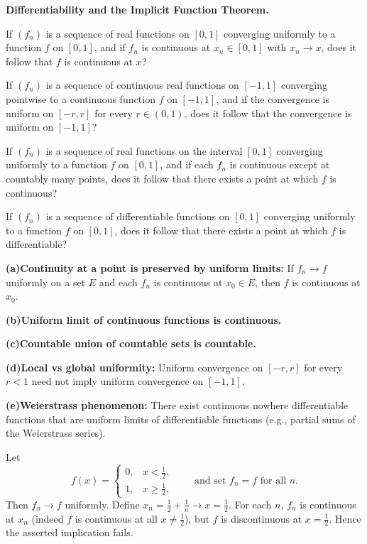 \begin{problem}[CP-II-0432]
\label{prob:cp-ii-0432}
\textbf{Differentiability and the Implicit Function Theorem.}

\hspace*{1.5em}If $(f_n)$ is a sequence of real functions on $[0,1]$ converging uniformly to a function $f$ on $[0,1]$, and if $f_n$ is continuous at $x_n\in[0,1]$ with $x_n\to x$, does it follow that $f$ is continuous at $x$?

  If $(f_n)$ is a sequence of continuous real functions on $[-1,1]$ converging pointwise to a continuous function $f$ on $[-1,1]$, and if the convergence is uniform on $[-r,r]$ for every $r\in(0,1)$, does it follow that the convergence is uniform on $[-1,1]$?

  If $(f_n)$ is a sequence of real functions on the interval $[0,1]$ converging uniformly to a function $f$ on $[0,1]$, and if each $f_n$ is continuous except at countably many points, does it follow that there exists a point at which $f$ is continuous?

  If $(f_n)$ is a sequence of differentiable functions on $[0,1]$ converging uniformly to a function $f$ on $[0,1]$, does it follow that there exists a point at which $f$ is differentiable?

\bigskip

	\par\smallskip\noindent\textbf{(a)}\quad \textbf{Continuity at a point is preserved by uniform limits:} If $f_n\to f$ uniformly on a set $E$ and each $f_n$ is continuous at $x_0\in E$, then $f$ is continuous at $x_0$.
	\par\smallskip\noindent\textbf{(b)}\quad \textbf{Uniform limit of continuous functions is continuous.}
	\par\smallskip\noindent\textbf{(c)}\quad \textbf{Countable union of countable sets is countable.}
	\par\smallskip\noindent\textbf{(d)}\quad \textbf{Local vs global uniformity:} Uniform convergence on $[-r,r]$ for every $r<1$ need not imply uniform convergence on $[-1,1]$.
	\par\smallskip\noindent\textbf{(e)}\quad \textbf{Weierstrass phenomenon:} There exist continuous nowhere differentiable functions that are uniform limits of differentiable functions (e.g., partial sums of the Weierstrass series).

Let
\[
f(x)=\begin{cases}
	0,& x<\tfrac12,\\
	1,& x\ge \tfrac12,
\end{cases}
\qquad \text{and set } f_n=f \text{ for all } n.
\]
Then $f_n\to f$ uniformly. Define $x_n=\tfrac12+\tfrac1n\to x=\tfrac12$. For each $n$, $f_n$ is continuous at $x_n$ (indeed $f$ is continuous at all $x\ne \tfrac12$), but $f$ is discontinuous at $x=\tfrac12$. Hence the asserted implication fails.


\end{problem}

